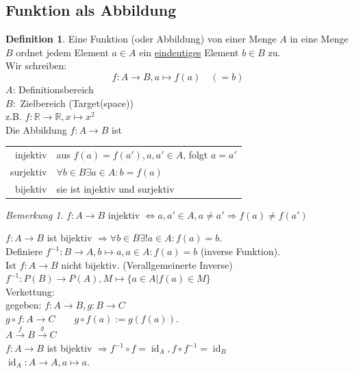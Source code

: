 \documentclass[12pt,a4paper,titlepage]{article} %
\theoremstyle{definition}
\newtheorem{defi}{Definition}[subsection]
\theoremstyle{remark}
\newtheorem*{bem}{Bemerkung}
\begin{document}
\subsection{Funktion als Abbildung}
\begin{defi}
	Eine Funktion (oder Abbildung) von einer Menge $A$ in eine Menge $B$ ordnet jedem Element $a\in A$ ein \underline{eindeutiges} Element $b \in B$ zu.\\
	Wir schreiben:
	\begin{equation*}
		f: A \rightarrow B, a \mapsto f(a)\quad(=b)
	\end{equation*}	
	$A$: Definitionsbereich\\
	$B:$ Zielbereich (Target(space))\\
	z.B. $f: \mathbb{R} \rightarrow \mathbb{R}, x \mapsto x^2$\\
	Die Abbildung $f: A \rightarrow B$ ist\\
	\begin{tabular}{r|l}
		injektiv&aus $f(a) = f(a'), a, a' \in A$, folgt $a=a'$\\
		surjektiv&$\forall b\in B \exists a\in A: b=f(a)$\\
		bijektiv&sie ist injektiv und surjektiv
	\end{tabular}
\end{defi}
\begin{bem}
	$f: A\rightarrow B$ injektiv $\Leftrightarrow a, a'\in A, a \neq a' \Rightarrow f(a) \neq f(a')$
\end{bem}
$f: A\rightarrow B$ ist bijektiv $\Rightarrow \forall b\in B \exists ! a\in A: f(a) = b$.\\
Definiere $f^{-1}: B\rightarrow A, b\mapsto a, a\in A: f(a) = b$ (inverse Funktion).\\
Ist $f: A\rightarrow B$ nicht bijektiv. (Verallgemeinerte Inverse)\\
$f^{-1}: P(B)\rightarrow P(A), M \mapsto\{a\in A|f(a)\in M\}$\\
Verkettung:\\
gegeben: $f:A\rightarrow B, g: B\rightarrow C$\\
$g\circ f: A\rightarrow C\qquad g\circ f(a):= g(f(a))$.\\
$A\overset{f}{\rightarrow} B \overset{g}{\rightarrow}C$\\
$f: A\rightarrow B$ ist bijektiv $\Rightarrow f^{-1}\circ f = \operatorname{id}_A, f\circ f^{-1} = \operatorname{id}_B$\\
$\operatorname{id}_A: A\rightarrow A, a\mapsto a.$
\end{document}

